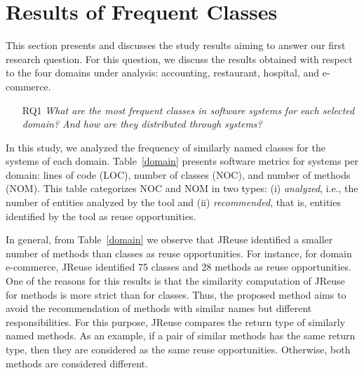 \section{Results of Frequent Classes}
\label{chsec:resultsClass}

This section presents and discusses the study results aiming to answer our first research question. For this question, we discuss the results obtained with respect to the four domains under analysis: accounting, restaurant, hospital, and e-commerce.

\begin{itemize}
   	\item[RQ1] \textit{What are the most frequent classes in  software systems for each selected domain? And how are they distributed through systems?}
\end{itemize}

In this study, we analyzed the frequency of similarly named classes for the systems of each domain. Table~\ref{domain} presents software metrics for systems per domain: lines of code (LOC), number of classes (NOC), and number of methods (NOM). This table categorizes NOC and NOM in two types: (i) \textit{analyzed}, i.e., the number of entities analyzed by the tool and (ii) \textit{recommended}, that is, entities identified by the tool as reuse opportunities. 

In general, from Table~\ref{domain} we observe that JReuse identified a smaller number of methods than classes as reuse opportunities. For instance, for domain e-commerce, JReuse identified 75 classes and 28 methods as reuse opportunities. One of the reasons for this results is that the similarity computation of JReuse for methods is more strict than for classes. Thus, the proposed method aims to avoid the recommendation of methods with similar names but different responsibilities. For this purpose, JReuse compares the return type of similarly named methods. As an example, if a pair of similar methods has the same return type, then they are considered as the same reuse opportunities. Otherwise, both methods are considered different.

